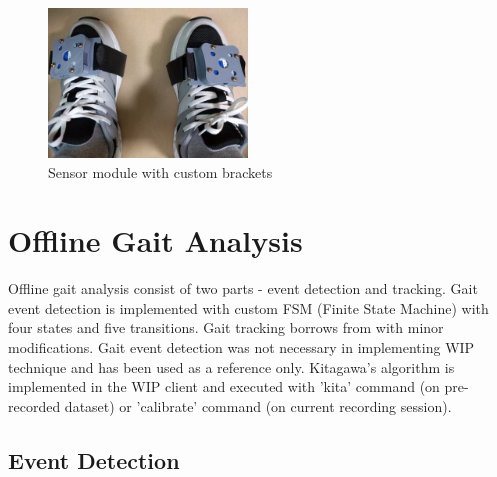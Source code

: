 \begin{figure}[th]
\captionsetup{justification=raggedright,singlelinecheck=false}
\centering
\includegraphics[width=150pt,height=\textheight,keepaspectratio]{Figures/sensor_module.jpg}
\decoRule
\caption[Sensor module with custom brackets]{Sensor module with custom brackets}
\label{fig:sensor_module}
\end{figure}


\section{Offline Gait Analysis}

Offline gait analysis consist of two parts - event detection and tracking. Gait event detection is implemented with custom FSM (Finite State Machine) with four states and five transitions. Gait tracking borrows from \cite{Kit16} with minor modifications. Gait event detection was not necessary in implementing WIP technique and has been used as a reference only. Kitagawa's algorithm is implemented in the WIP client and executed with 'kita' command (on pre-recorded dataset) or 'calibrate' command (on current recording session).

\subsection{Event Detection}

